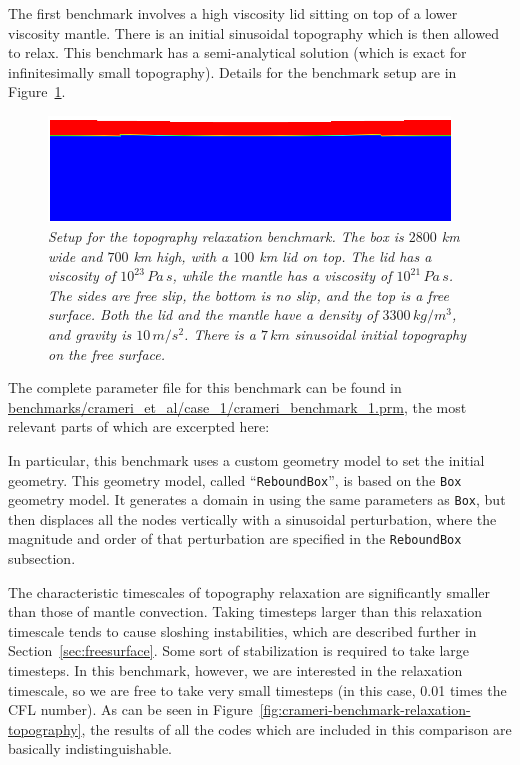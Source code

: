 \documentclass{article}
\begin{document}
The first benchmark involves a high viscosity lid sitting on top of a lower viscosity 
mantle. There is an initial sinusoidal topography which is then allowed to relax.
This benchmark has a semi-analytical solution (which is exact for infinitesimally small
topography). Details for the benchmark setup are in Figure~\ref{fig:crameri-benchmark-initial-topography}.


\begin{figure}
  \begin{center}
    \includegraphics[width=0.95\textwidth]{cookbooks/benchmarks/crameri/initial_topography.png}
  \end{center}
  \caption{\it Setup for the topography relaxation benchmark. The box is $2800$ km wide and $700$ km high, with 
    a $100$ km lid on top. The lid has a viscosity of $10^{23} \, {Pa\,s}$, while the mantle has a viscosity of $10^{21} \, {Pa\,s}$.  The sides are 
    free slip, the bottom is no slip, and the top is a free surface.  Both the lid and the mantle have 
    a density of $3300 \,{kg/m^3}$, and gravity is $10 \, {m/s^2}$. There is a $7 \, {km}$ 
    sinusoidal initial topography on the free surface.}
  \label{fig:crameri-benchmark-initial-topography}
\end{figure}

The complete parameter file for this benchmark can be found in 
\url{benchmarks/crameri_et_al/case_1/crameri_benchmark_1.prm}, 
the  most relevant parts of which are excerpted here: 

In particular, this benchmark uses a custom geometry model to set the initial geometry. 
This geometry model, called ``\texttt{ReboundBox}'', is based on the \texttt{Box} geometry model. 
It generates a domain in using the same parameters as \texttt{Box}, but then displaces all 
the nodes vertically with a sinusoidal perturbation, where the magnitude and order of that 
perturbation are specified in the \texttt{ReboundBox} subsection.


The characteristic timescales of topography relaxation are significantly smaller than those of 
mantle convection. Taking timesteps larger than this relaxation timescale tends to cause sloshing
instabilities, which are described further in Section~\ref{sec:freesurface}. Some sort of stabilization 
is required to take large timesteps. In this benchmark, however, we are interested in the relaxation 
timescale, so we are free to take very small timesteps (in this case, 0.01 times the CFL 
number).  As can be seen in Figure~\ref{fig:crameri-benchmark-relaxation-topography}, the results of all the 
codes which are included in this comparison are basically indistinguishable.
\end{document}
